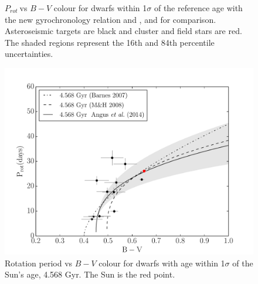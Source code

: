 \documentclass[11pt,preprint]{aastex}
\newcommand{\prot}{$P_{rot}~$}
\begin{document}
\begin{figure}[ht]
\begin{center}
{        }
    \end{center}
    \caption{ \prot vs $B-V$ colour for dwarfs within 1$\sigma$ of the reference age with the new gyrochronology relation and \citet{Barnes2007}, and \citet{Mamajek2008} for comparison. Asteroseismic targets are black and cluster and field stars are red. The shaded regions represent the 16th and 84th percentile uncertainties.
   \label{fig:subfigures2}}
\end{figure}


\begin{figure}[ht]
\begin{center}
\includegraphics[width=6in, clip=true, trim=0 0 0.5in 0]{p_vs_bv_solar.pdf}
\caption{Rotation period vs $B-V$ colour for dwarfs with age within 1$\sigma$ of the Sun's age, 4.568 Gyr. The Sun is the red point.
\label{fig:p_vs_bv_solar}}
\end{center}
\end{figure}
\end{document}
